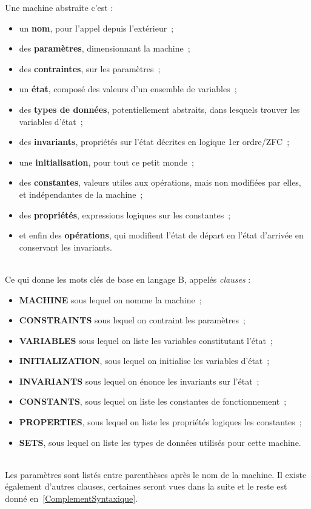 \documentclass[10pt,a4paper]{article}
\begin{document}
Une machine abstraite c'est :
\begin{itemize}
\item un \textbf{nom}, pour l'appel depuis l'extérieur~;
\\
\item des \textbf{paramètres}, dimensionnant la machine~;
\item des \textbf{contraintes}, sur les paramètres~;
\\
\item un \textbf{état}, composé des valeurs d'un ensemble de variables~;
\item des \textbf{types de données}, potentiellement abstraits, dans lesquels trouver les variables d'état~;
\item des \textbf{invariants}, propriétés sur l'état décrites en logique 1er ordre/ZFC~;
\item une \textbf{initialisation}, pour tout ce petit monde~;
\\
\item des \textbf{constantes}, valeurs utiles aux opérations, mais non modifiées par elles, et indépendantes de la machine~;
\item des \textbf{propriétés}, expressions logiques sur les constantes~;
\\
\item et enfin des \textbf{opérations}, qui modifient l'état de départ en l'état d'arrivée en conservant les invariants.
\end{itemize}
\ \\
Ce qui donne les mots clés de base en langage B, appelés \emph{clauses} :
\begin{itemize}
\item \textbf{MACHINE} sous lequel on nomme la machine~;
\item \textbf{CONSTRAINTS} sous lequel on contraint les paramètres~;
\item \textbf{VARIABLES} sous lequel on liste les variables constitutant l'état~;
\item \textbf{INITIALIZATION}, sous lequel on initialise les variables d'état~;
\item \textbf{INVARIANTS} sous lequel on énonce les invariants sur l'état~;
\item \textbf{CONSTANTS}, sous lequel on liste les constantes de fonctionnement~;
\item \textbf{PROPERTIES}, sous lequel on liste les propriétés logiques les constantes~;
\item \textbf{SETS}, sous lequel on liste les types de données utilisés pour cette machine.
\end{itemize}
\ \\
Les paramètres sont listés entre parenthèses après le nom de la machine. Il existe également d'autres clauses, certaines seront vues dans la suite et le reste est donné en~\cref{ComplementSyntaxique}.
\end{document}
